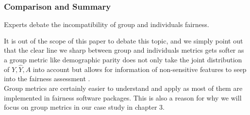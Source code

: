 

\subsubsection*{Comparison and Summary}
Experts debate the incompatibility of group and individuals fairness.

It is out of the scope of this paper to debate this topic, and we simply point out that the clear line we sharp between group and individuals metrics gets softer as a group metric like demographic parity does not only take the joint distribution of $Y, \hat{Y}, A$ into account but allows for information of non-sensitive features to seep into the fairness assessment \cite{castelnovo2022}.\\
Group metrics are certainly easier to understand and apply as most of them are implemented in fairness software packages. This is also a reason for why we will focus on group metrics in our case study in chapter 3.



